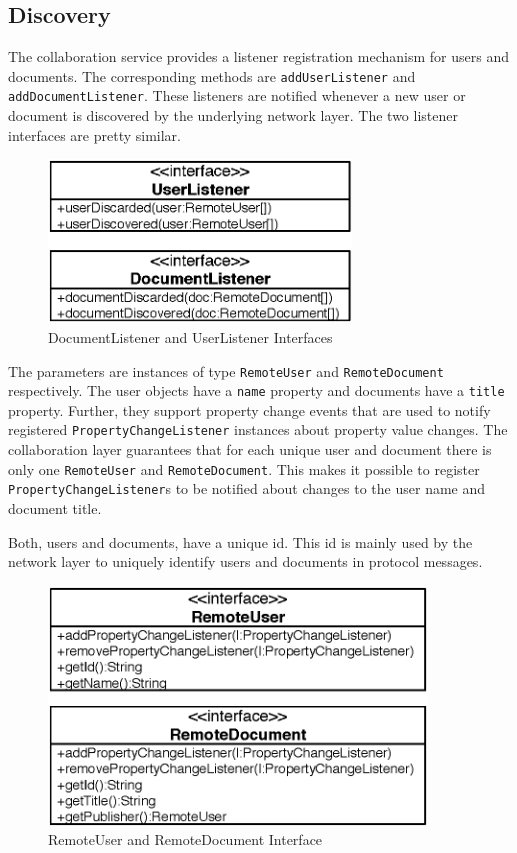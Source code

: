 \subsection{Discovery}
\label{sect:archoverview.discovery}
The collaboration service provides a listener registration mechanism for
users and documents. The corresponding methods are \texttt{add\-User\-Listener}
and \texttt{add\-Document\-Listener}. These listeners are notified whenever a
new user or document is discovered by the underlying network layer. The two 
listener interfaces are pretty similar. 

\begin{figure}[H]
 \centering
 \includegraphics[width=8.04cm,height=4.34cm]{../images/finalreport/architecture_listener_uml.eps}
 \caption{DocumentListener and UserListener Interfaces}
\end{figure}

The parameters are instances of type \texttt{Remote\-User} and
\texttt{Remote\-Document} respectively. The user objects have a \texttt{name}
property and documents have a \texttt{title} property. Further, they support
property change events that are used to notify registered 
\texttt{Property\-Change\-Listener} instances about property value changes. 
The collaboration layer guarantees that for each unique user and document
there is only one \texttt{Remote\-User} and \texttt{Remote\-Document}. 
This makes
it possible to register \texttt{Property\-Change\-Listener}s to be 
notified about changes to the user name and document title. 

Both, users and documents, have a unique id. This id is mainly used by the
network layer to uniquely identify users and documents in protocol messages.

\begin{figure}[H]
 \centering
 \includegraphics[width=10.05cm,height=6.35cm]{../images/finalreport/architecture_userdocument_uml.eps}
 \caption{RemoteUser and RemoteDocument Interface}
\end{figure}

